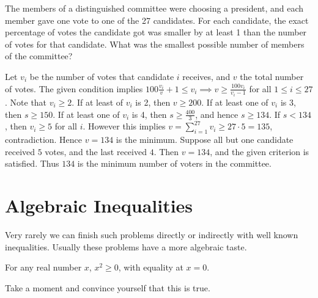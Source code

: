\documentclass[blue,onecol]{shooting}
\begin{document}
\begin{exam}[AIME II 2003/12]
The members of a distinguished committee were choosing a president, and each member gave one vote to one of the 27 candidates. For each candidate, the exact percentage of votes the candidate got was smaller by at least 1 than the number of votes for that candidate. What was the smallest possible number of members of the committee?
\end{exam}
\begin{sol}
Let $v_i$ be the number of votes that candidate $i$ receives, and $v$ the total number of votes. The given condition implies $100\frac{v_i}v+1\le v_i\implies v\ge \frac{100v_i}{v_i-1}$ for all $1\le i\le 27$. Note that $v_i\ge 2$. If at least of $v_i$ is 2, then $v\ge 200$. If at least one of $v_i$ is 3, then $s\geq 150$. If at least one of $v_i$ is 4, then $s\geq \frac{400}3$, and hence $s\geq 134$. 
If $s<134$, then $v_i\ge 5$ for all $i$. However this implies $v=\sum_{i=1}^{27}v_i\ge 27\cdot 5=135$, contradiction. Hence $v=134$ is the minimum.
Suppose all but one candidate received $5$ votes, and the last received $4$. Then $v=134$, and the given criterion is satisfied. Thus $134$ is the minimum number of voters in the committee.  
\end{sol}

\section{Algebraic Inequalities}

Very rarely we can finish such problems directly or indirectly with well known inequalities. Usually these problems have a more algebraic taste. 

\begin{theo} 
For any real number $x$, $x^2\ge0$, with equality at $x=0$. 
\end{theo}
Take a moment and convince yourself that this is true. 
\end{document}
